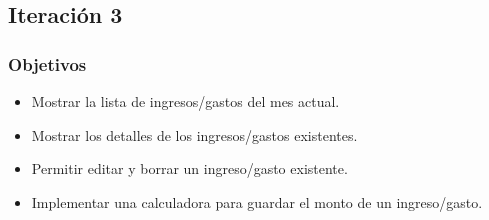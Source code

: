 %

\subsection{Iteración 3}
\subsubsection{Objetivos}
\begin{itemize}
\item Mostrar la lista de ingresos/gastos del mes actual.
\item Mostrar los detalles de los ingresos/gastos existentes.
\item Permitir editar y borrar un ingreso/gasto existente.
\item Implementar una calculadora para guardar el monto de un ingreso/gasto.
\end{itemize}

